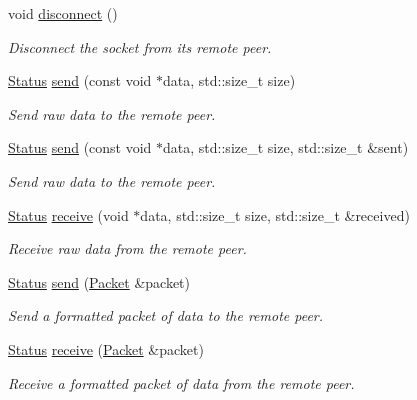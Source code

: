 \begin{DoxyCompactItemize}
void \hyperlink{classsf_1_1TcpSocket_ac18f518a9be3d6be5e74b9404c253c1e}{disconnect} ()
\begin{DoxyCompactList}\small\item\em Disconnect the socket from its remote peer. \end{DoxyCompactList}\item 
\hyperlink{classsf_1_1Socket_a51bf0fd51057b98a10fbb866246176dc}{Status} \hyperlink{classsf_1_1TcpSocket_affce26ab3bcc4f5b9269dad79db544c0}{send} (const void $\ast$data, std\+::size\+\_\+t size)
\begin{DoxyCompactList}\small\item\em Send raw data to the remote peer. \end{DoxyCompactList}\item 
\hyperlink{classsf_1_1Socket_a51bf0fd51057b98a10fbb866246176dc}{Status} \hyperlink{classsf_1_1TcpSocket_a31f5b280126a96c6f3ad430f4cbcb54d}{send} (const void $\ast$data, std\+::size\+\_\+t size, std\+::size\+\_\+t \&sent)
\begin{DoxyCompactList}\small\item\em Send raw data to the remote peer. \end{DoxyCompactList}\item 
\hyperlink{classsf_1_1Socket_a51bf0fd51057b98a10fbb866246176dc}{Status} \hyperlink{classsf_1_1TcpSocket_a90ce50811ea61d4f00efc62bb99ae1af}{receive} (void $\ast$data, std\+::size\+\_\+t size, std\+::size\+\_\+t \&received)
\begin{DoxyCompactList}\small\item\em Receive raw data from the remote peer. \end{DoxyCompactList}\item 
\hyperlink{classsf_1_1Socket_a51bf0fd51057b98a10fbb866246176dc}{Status} \hyperlink{classsf_1_1TcpSocket_a0f8276e2b1c75aac4a7b0a707b250f44}{send} (\hyperlink{classsf_1_1Packet}{Packet} \&packet)
\begin{DoxyCompactList}\small\item\em Send a formatted packet of data to the remote peer. \end{DoxyCompactList}\item 
\hyperlink{classsf_1_1Socket_a51bf0fd51057b98a10fbb866246176dc}{Status} \hyperlink{classsf_1_1TcpSocket_aa655352609bc9804f2baa020df3e7331}{receive} (\hyperlink{classsf_1_1Packet}{Packet} \&packet)
\begin{DoxyCompactList}\small\item\em Receive a formatted packet of data from the remote peer. \end{DoxyCompactList}\end{DoxyCompactItemize}
